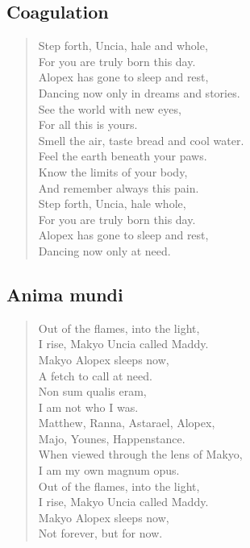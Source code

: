 \subsection{Coagulation}

\begin{verse}
Step forth, Uncia, hale and whole,\\
\vin For you are truly born this day.\\
Alopex has gone to sleep and rest,\\
\vin Dancing now only in dreams and stories.\\
See the world with new eyes,\\
\vin For all this is yours.\\
Smell the air, taste bread and cool water.\\
\vin Feel the earth beneath your paws.\\
Know the limits of your body,\\
\vin And remember always this pain.\\
Step forth, Uncia, hale whole,\\
\vin For you are truly born this day.\\
Alopex has gone to sleep and rest,\\
\vin Dancing now only at need.\\
\end{verse}
\newpage

\subsection{Anima mundi}

\begin{verse}
Out of the flames, into the light,\\
\vin I rise, Makyo Uncia called Maddy.\\
Makyo Alopex sleeps now,\\
\vin A fetch to call at need.\\
Non sum qualis eram,\\
\vin I am not who I was.\\
Matthew, Ranna, Astarael, Alopex,\\
\vin Majo, Younes, Happenstance.\\
When viewed through the lens of Makyo,\\
\vin I am my own magnum opus.\\
Out of the flames, into the light,\\
\vin I rise, Makyo Uncia called Maddy.\\
Makyo Alopex sleeps now,\\
\vin Not forever, but for now.
\end{verse}
